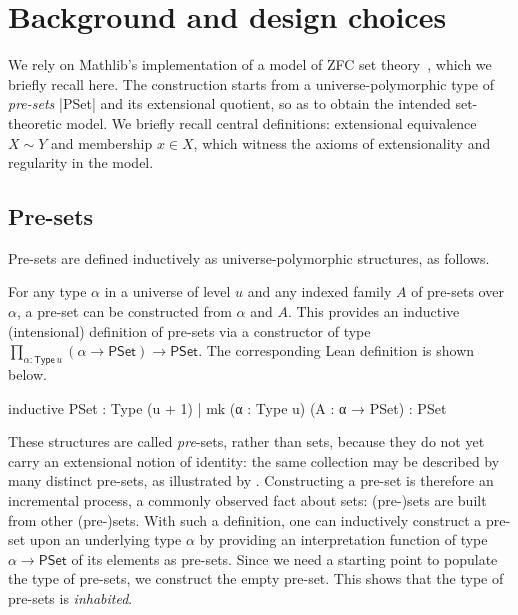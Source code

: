 \section{Background and design choices}
\label{sec:zflean-background}

We rely on Mathlib's implementation of a model of ZFC set theory~\cite{mathlib-zfc}, which we briefly recall here.
The construction starts from a universe-polymorphic type of \emph{pre-sets} \inlinelean|PSet| and its extensional quotient, so as to obtain the intended set-theoretic model.
We briefly recall central definitions: extensional equivalence \(X \sim Y\) and membership \(x \in X\), which witness the axioms of extensionality and regularity in the model.

\subsection{Pre-sets}

Pre-sets are defined inductively as universe-polymorphic structures, as follows.

\begin{definition}
  For any type \(\alpha\) in a universe of level \(u\)\footnotemark{}
  and any indexed family \(A\) of pre-sets over \(\alpha\), a pre-set can be constructed from \(\alpha\) and \(A\).
  This provides an inductive (intensional) definition of pre-sets via a constructor of type \(\prod_{\alpha \colon \mathsf{Type}\, u} (\alpha \to \mathsf{PSet}) \to \mathsf{PSet}\).
  The corresponding Lean definition is shown below.
  \begin{leanlisting}[label={lst:pset}]
inductive PSet : Type (u + 1)
| mk (α : Type u) (A : α → PSet) : PSet
  \end{leanlisting}
\end{definition}

These structures are called \emph{pre}-sets, rather than sets, because they do not yet carry an extensional notion of identity: the same collection may be described by many distinct pre-sets, as illustrated by .
Constructing a pre-set is therefore an incremental process, a commonly observed fact about sets: (pre-)sets are built from other (pre-)sets.
With such a definition, one can inductively construct a pre-set upon an underlying type \(\alpha\) by providing an interpretation function of type \(\alpha \to \mathsf{PSet}\) of its elements as pre-sets.
Since we need a starting point to populate the type of pre-sets, we construct the empty pre-set. This shows that the type of pre-sets is \emph{inhabited}.

